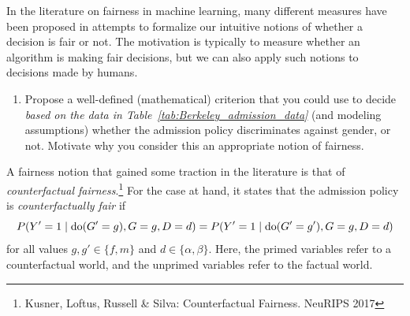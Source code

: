 In the literature on fairness in machine learning, many different measures have been proposed in attempts to formalize our intuitive notions of whether a decision is fair or not.
The motivation is typically to measure whether an algorithm is making fair decisions, but we can also apply such notions to decisions made by humans.
\begin{enumerate}[resume*]
  \item Propose a well-defined (mathematical) criterion that you could use to decide \emph{based on the data in Table~\ref{tab:Berkeley_admission_data}} (and modeling assumptions) whether the admission policy discriminates against gender, or not.
    Motivate why you consider this an appropriate notion of fairness.
\end{enumerate}

A fairness notion that gained some traction in the literature is that of \emph{counterfactual fairness}.\footnote{Kusner, Loftus, Russell \& Silva: Counterfactual Fairness. NeuRIPS 2017}
For the case at hand, it states that the admission policy is \emph{counterfactually fair} if
$$P(Y' = 1 \mid \operatorname{do}(G' = g), G = g, D=d) = P(Y' = 1 \mid \operatorname{do}(G' = g'), G = g, D=d)$$
for all values $g,g' \in \{f,m\}$ and $d\in\{\alpha,\beta\}$. 
Here, the primed variables refer to a counterfactual world, and the unprimed variables refer to the factual world.

